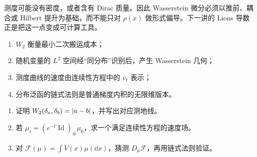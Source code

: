 \begin{pitfall}
测度可能没有密度，或者含有 Dirac 质量。因此 Wasserstein 微分必须以推前、耦合或 Hilbert 提升为基础，而不能只对 $\rho(x)$ 做形式偏导。下一讲的 Lions 导数正是把这一点变成可计算工具。
\end{pitfall}

\begin{takeaway}
\begin{enumerate}
  \item $W_2$ 衡量最小二次搬运成本；
  \item 随机变量的 $L^2$ 空间经“同分布”识别后，产生 Wasserstein 几何；
  \item 测度曲线的速度由连续性方程中的 $v_t$ 表示；
  \item 分布泛函的链式法则是普通梯度内积的无限维版本。
\end{enumerate}
\end{takeaway}

\begin{exercisebox}
\begin{enumerate}
  \item 证明 $W_2(\delta_a,\delta_b)=\left\lvert a-b\right\rvert$，并写出对应测地线。
  \item 若 $\mu_t=(e^{-t}\operatorname{Id})_\#\mu_0$，求一个满足连续性方程的速度场。
  \item 对 $\mathcal F(\mu)=\int V(x)\mu(\dd x)$，猜测 $D_\mu\mathcal F$，再用链式法则验证。
\end{enumerate}
\end{exercisebox}
